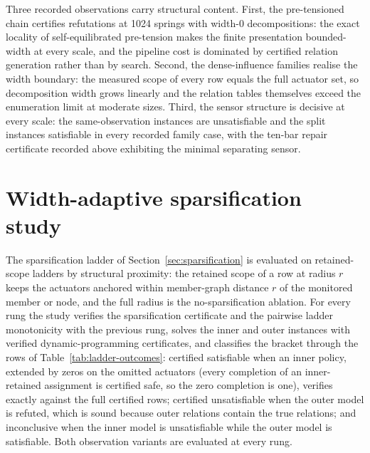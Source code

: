 \documentclass[11pt]{article}
\theoremstyle{plain}
\theoremstyle{definition}
\theoremstyle{remark}
\begin{document}
Three recorded observations carry structural content.  First, the
pre-tensioned chain certifies refutations at 1024 springs with width-0
decompositions: the exact locality of self-equilibrated pre-tension makes
the finite presentation bounded-width at every scale, and the pipeline cost
is dominated by certified relation generation rather than by search.  Second,
the dense-influence families realise the width boundary: the measured scope
of every row equals the full actuator set, so decomposition width grows
linearly and the relation tables themselves exceed the enumeration limit at
moderate sizes.  Third, the sensor structure is decisive at every scale: the
same-observation instances are unsatisfiable and the split instances
satisfiable in every recorded family case, with the ten-bar repair
certificate recorded above exhibiting
the minimal separating sensor.

\section{Width-adaptive sparsification study}
\label{sec:sparsification-study}

The sparsification ladder of Section~\ref{sec:sparsification} is evaluated
on retained-scope ladders by structural proximity: the retained scope of a
row at radius \(r\) keeps the actuators anchored within member-graph
distance \(r\) of the monitored member or node, and the full radius is the
no-sparsification ablation.  For every rung the study verifies the
sparsification certificate and the pairwise ladder monotonicity with the
previous rung, solves the inner and outer instances with verified
dynamic-programming certificates, and classifies the bracket through the rows
of Table~\ref{tab:ladder-outcomes}: certified
satisfiable when an inner policy, extended by zeros on the omitted
actuators (every completion of an inner-retained assignment is certified
safe, so the zero completion is one), verifies exactly against the full
certified rows; certified
unsatisfiable when the outer model is refuted, which is sound because outer
relations contain the true relations; and inconclusive when the inner model
is unsatisfiable while the outer model is satisfiable.  Both observation
variants are evaluated at every rung.
\end{document}
